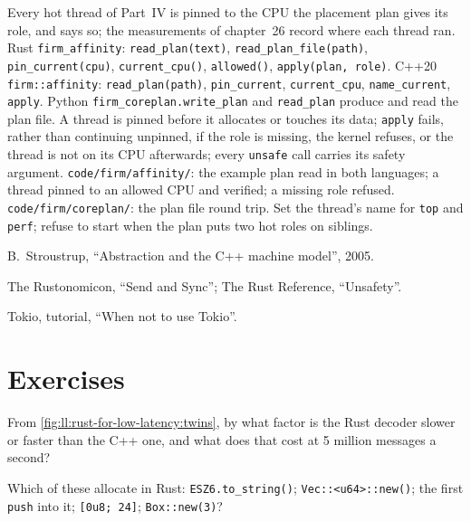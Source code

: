 \begin{build}
 Every hot thread of Part~IV is pinned to the CPU the placement plan gives its role, and says so; the
measurements of chapter~26 record where each thread ran.
 Rust \texttt{firm\_affinity}: \texttt{read\_plan(text)}, \texttt{read\_plan\_file(path)},
\texttt{pin\_current(cpu)}, \texttt{current\_cpu()}, \texttt{allowed()}, \texttt{apply(plan, role)}. C++20
\texttt{firm::affinity}: \texttt{read\_plan(path)}, \texttt{pin\_current}, \texttt{current\_cpu}, \texttt{name\_current},
\texttt{apply}. Python \texttt{firm\_coreplan.write\_plan} and \texttt{read\_plan} produce and read the plan file.
 A thread is pinned before it allocates or touches its data; \texttt{apply} fails, rather than continuing
unpinned, if the role is missing, the kernel refuses, or the thread is not on its CPU afterwards; every \texttt{unsafe}
call carries its safety argument.
 \texttt{code/firm/affinity/}: the example plan read in both languages; a thread pinned to an
allowed CPU and verified; a missing role refused. \texttt{code/firm/coreplan/}: the plan file round trip.
 Set the thread's name for \texttt{top} and \texttt{perf}; refuse to start when the plan puts two hot roles
on siblings.
\end{build}

\begin{omsources}
\item B.~Stroustrup, ``Abstraction and the C++ machine model'', 2005.
\item The Rustonomicon, ``Send and Sync''; The Rust Reference, ``Unsafety''.
\item Tokio, tutorial, ``When not to use Tokio''.
\end{omsources}

\section{Exercises}

\begin{exercise}[$\star$]\label{exo:ll:rust-for-low-latency:1}
From \cref{fig:ll:rust-for-low-latency:twins}, by what factor is the Rust decoder slower or faster than the C++ one, and
what does that cost at 5 million messages a second?
\end{exercise}

\begin{exercise}[$\star$]\label{exo:ll:rust-for-low-latency:2}
Which of these allocate in Rust: \texttt{\textquotedbl{}ESZ6\textquotedbl{}.to\_string()}; \texttt{Vec::<u64>::new()}; the first
\texttt{push} into it; \texttt{[0u8; 24]}; \texttt{Box::new(3)}?
\end{exercise}

